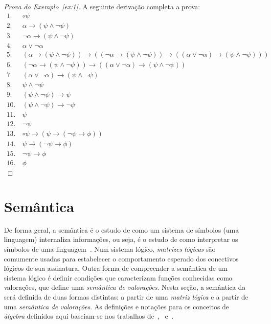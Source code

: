     \begin{proof}[Prova do Exemplo~\ref{ex:1}]
        A seguinte derivação completa a prova:
        \begin{align*}
            1.~& \circ \psi \tag{Premissa} \\
            2.~& \alpha \to (\psi \land \neg \psi) \tag{Premissa} \\
            3.~& \neg \alpha \to (\psi \land \neg \psi) \tag{Premissa} \\
            4.~& \alpha \lor \neg \alpha \tag{Ax10} \\
            5.~& (\alpha \to (\psi \land \neg \psi)) \to ((\neg \alpha \to (\psi \land \neg \psi)) \to ((\alpha \lor \neg \alpha) \to (\psi \land \neg \psi))) \tag{Ax8} \\
            6.~& (\neg \alpha \to (\psi \land \neg \psi)) \to ((\alpha \lor \neg \alpha) \to (\psi \land \neg \psi)) \tag{MP 2, 5}\\
            7.~& (\alpha \lor \neg \alpha) \to (\psi \land \neg \psi) \tag{MP 3, 6}\\
            8.~& \psi \land \neg \psi \tag{MP 4, 7} \\
            9.~& (\psi \land \neg \psi) \to \psi \tag{Ax4} \\
            10.~& (\psi \land \neg \psi) \to \neg \psi \tag{Ax5} \\
            11.~& \psi \tag{MP 8, 9}\\
            12.~& \neg \psi \tag{MP 8, 10}\\
            13.~& \circ \psi \to (\psi \to (\neg \psi \to \phi)) \tag{bc1}\\
            14.~& \psi \to (\neg \psi \to \phi) \tag{MP 1, 13}\\
            15.~& \neg \psi \to \phi \tag{MP 11, 14} \\
            16.~& \phi \tag{MP, 12, 15}
        \end{align*}
    \end{proof}


\section{Semântica}\label{sec:semantica}
    De forma geral, a semântica é o estudo de como um sistema de símbolos (uma linguagem) internaliza informações, ou seja, é o estudo de como interpretar os símbolos de uma linguagem~\cite{brown2005encyclopedia}. Num sistema lógico, \textit{matrizes lógicas} são comumente usadas para estabelecer o comportamento esperado dos conectivos lógicos de sua assinatura. Outra forma de compreender a semântica de um sistema lógico é definir condições que caracterizam funções conhecidas como valorações, que define uma \textit{semântica de valorações}. Nesta seção, a semântica da \lfium{} será definida de duas formas distintas: a partir de uma \textit{matriz lógica} e a partir de uma \textit{semântica de valorações}. As definições e notações para os conceitos de \textit{álgebra} definidos aqui baseiam-se nos trabalhos de~,~ e~.
    

